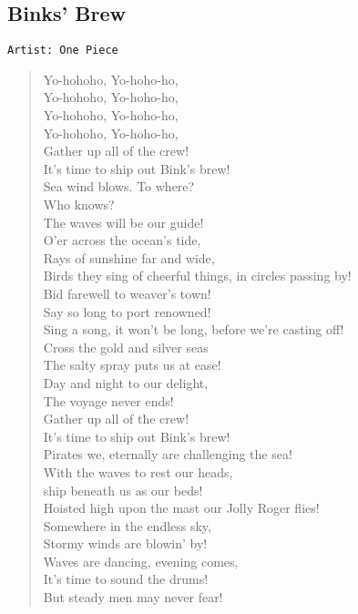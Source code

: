 \documentclass[11pt]{article}
\begin{document}
\subsection{Binks' Brew}
\label{sec:org945c35c}
\begin{verbatim}
Artist: One Piece
\end{verbatim}
\begin{verse}
Yo-hohoho, Yo-hoho-ho,\\
Yo-hohoho, Yo-hoho-ho,\\
Yo-hohoho, Yo-hoho-ho,\\
Yo-hohoho, Yo-hoho-ho,\\
Gather up all of the crew!\\
It's time to ship out Bink's brew!\\
Sea wind blows. To where?\\
Who knows?\\
The waves will be our guide!\\
O'er across the ocean's tide,\\
Rays of sunshine far and wide,\\
Birds they sing of cheerful things, in circles passing by!\\
Bid farewell to weaver's town!\\
Say so long to port renowned!\\
Sing a song, it won't be long, before we're casting off!\\
Cross the gold and silver seas\\
The salty spray puts us at ease!\\
Day and night to our delight,\\
The voyage never ends!\\
Gather up all of the crew!\\
It's time to ship out Bink's brew!\\
Pirates we, eternally are challenging the sea!\\
With the waves to rest our heads,\\
ship beneath us as our beds!\\
Hoisted high upon the mast our Jolly Roger flies!\\
Somewhere in the endless sky,\\
Stormy winds are blowin' by!\\
Waves are dancing, evening comes,\\
It's time to sound the drums!\\
But steady men may never fear!\\

\end{verse}
\end{document}
